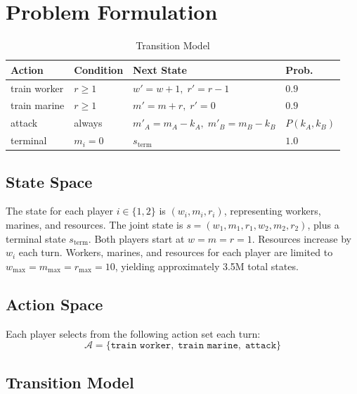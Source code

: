 \documentclass[conference]{IEEEtran}
\begin{document}
\section{Problem Formulation}\label{sec:formulation}
\begin{table}[t]
\centering
\caption{Transition Model}
\label{tab:transition_model}
\begin{tabular}{llll}
  \toprule
  \textbf{Action} & \textbf{Condition} & \textbf{Next State} & \textbf{Prob.} \\
  \midrule
  train worker  & $r \geq 1$  & $w' = w+1,\; r' = r-1$                & $0.9$ \\
  train marine  & $r \geq 1$  & $m' = m+r,\; r' = 0$                   & $0.9$ \\
  attack        & always      & $m'_A = m_A - k_A,\; m'_B = m_B - k_B$ & $P(k_A,k_B)$ \\
  terminal      & $m_i = 0$   & $s_{\text{term}}$                       & $1.0$ \\
  \bottomrule
\end{tabular}
\end{table}

\subsection{State Space}

The state for each player $i \in \{1, 2\}$ is $(w_i, m_i, r_i)$, representing workers,
marines, and resources. The joint state is $s = (w_1, m_1, r_1, w_2, m_2, r_2)$, plus
a terminal state $s_{\text{term}}$. Both players start at $w = m = r = 1$. Resources
increase by $w_i$ each turn. Workers, marines, and resources for each player are
limited to $w_{\max} = m_{\max} = r_{\max} = 10$, yielding approximately 3.5M total
states.

\subsection{Action Space}

Each player selects from the following action set each turn:
\[
  \mathcal{A} = \{\texttt{train worker},\; \texttt{train marine},\; \texttt{attack}\}
\]

\subsection{Transition Model}
\end{document}

